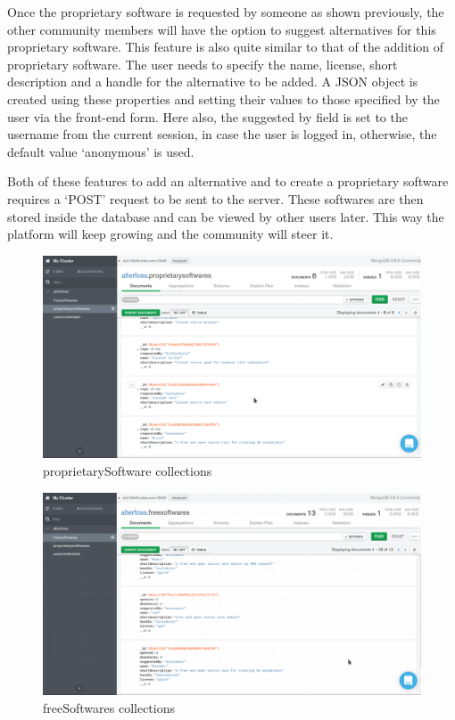 Once the proprietary software is requested by someone as shown previously, the other community members will have the option to suggest alternatives for this proprietary software. This feature is also quite similar to that of the addition of proprietary software. The user needs to specify the name, license, short description and a handle for the alternative to be added. A JSON object is created using these properties and setting their values to those specified by the user via the front-end form. Here also, the suggested by field is set to the username from the current session, in case the user is logged in, otherwise, the default value ‘anonymous’ is used.

Both of these features to add an alternative and to create a proprietary software requires a ‘POST’ request to be sent to the server. These softwares are then stored inside the database and can be viewed by other users later. This way the platform will keep growing and the community will steer it.

\begin{figure}[h!]
\includegraphics[scale=0.47]{images/4-8.png}
\caption{proprietarySoftware collections}
\label{fig:prop_db_collections}
\end{figure}

\begin{figure}[h!]
\includegraphics[scale=0.5]{images/4-9.png}
\caption{freeSoftwares collections}
\label{fig:fs_db_collections}
\end{figure}

